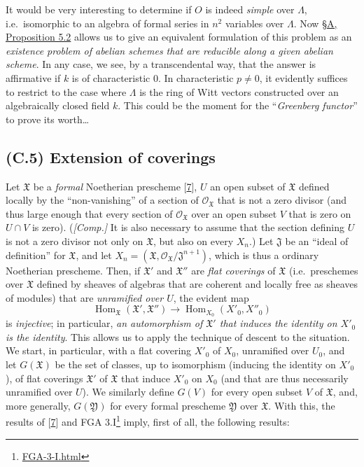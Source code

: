 \documentclass{article}
\renewcommand{\href}[2]{#2\footnote{\url{#1}}}
\newcommand{\oldpage}[1]{\marginpar{\footnotesize$\Big\vert$ \textit{p.~#1}}}
\theoremstyle{definition}
\theoremstyle{definition}
\theoremstyle{definition}
\theoremstyle{definition}
\theoremstyle{remark}
\begin{document}
It would be very interesting to determine if \(O\) is indeed \emph{simple} over \(\Lambda\), i.e.~isomorphic to an algebra of formal series in \(n^2\) variables over \(\Lambda\).
Now \protect\hyperlink{fga-3-ii-section-A.5-proposition-5.2}{§A, Proposition 5.2} allows us to give an equivalent formulation of this problem as an \emph{existence problem of abelian schemes that are reducible along a given abelian scheme}.
In any case, we see, by a transcendental way, that the answer is affirmative if \(k\) is of characteristic \(0\).
In characteristic \(p\neq0\), it evidently suffices to restrict to the case where \(\Lambda\) is the ring of Witt vectors constructed over an algebraically closed field \(k\).
This could be the moment for the ``\emph{Greenberg functor}'' to prove its worth\ldots{}

\hypertarget{fga-3-ii-section-C.5}{%
\subsection{(C.5) Extension of coverings}\label{fga-3-ii-section-C.5}}

Let \({\mathfrak{X}}\) be a \emph{formal} Noetherian prescheme {[}\protect\hyperlink{ref-Gro1958a}{7}{]}, \(U\) an open subset of \({\mathfrak{X}}\) defined locally by the ``non-vanishing'' of a section of \({\mathscr{O}}_{\mathfrak{X}}\) that is not a zero divisor (and thus large enough that every section of \({\mathscr{O}}_{\mathfrak{X}}\) over an open subset \(V\) that is zero on \(U\cap V\) is zero).
(\emph{{[}Comp.{]}} It is also necessary to assume that the section defining \(U\) is not a zero divisor not only on \({\mathfrak{X}}\), but also on every \(X_n\).)
Let \({\mathfrak{J}}\) be an ``ideal of definition'' for \({\mathfrak{X}}\), and let \(X_n=({\mathfrak{X}},{\mathscr{O}}_{\mathfrak{X}}/{\mathfrak{J}}^{n+1})\), which is thus a ordinary Noetherian prescheme.
Then, if \({\mathfrak{X}}'\) and \({\mathfrak{X}}''\) are \emph{flat coverings} of \({\mathfrak{X}}\) (i.e.~preschemes over \({\mathfrak{X}}\) defined by sheaves of algebras that are coherent and locally free as sheaves of modules) that are \emph{unramified over \(U\)}, the evident map
\[
  \operatorname{Hom}_{\mathfrak{X}}({\mathfrak{X}}',{\mathfrak{X}}'') \to \operatorname{Hom}_{X_0}(X'_0,X''_0)
\]
is \emph{injective};
in particular, \emph{an automorphism of \({\mathfrak{X}}'\) that induces the identity on \(X'_0\) is the identity}.
This allows us to apply the technique of descent to the situation.
\oldpage{195-20}We start, in particular, with a flat covering \(X'_0\) of \(X_0\), unramified over \(U_0\), and let \(G({\mathfrak{X}})\) be the set of classes, up to isomorphism (inducing the identity on \(X'_0\)), of flat coverings \({\mathfrak{X}}'\) of \({\mathfrak{X}}\) that induce \(X'_0\) on \(X_0\) (and that are thus necessarily unramified over \(U\)).
We similarly define \(G(V)\) for every open subset \(V\) of \({\mathfrak{X}}\), and, more generally, \(G({\mathfrak{Y}})\) for every formal prescheme \({\mathfrak{Y}}\) over \({\mathfrak{X}}\).
With this, the results of {[}\protect\hyperlink{ref-Gro1958a}{7}{]} and \href{FGA-3-I.html}{FGA 3.I} imply, first of all, the following results:
\end{document}
